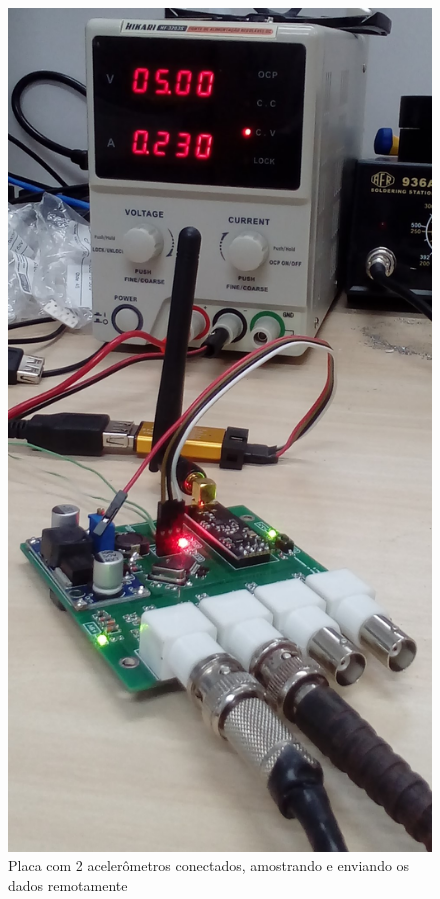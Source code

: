 \documentclass[11pt]{abntex2}
\begin{document}
				\begin{figure}[H]
					\centering
					\begin{minipage}{0.4\linewidth}
						\centering
						\includegraphics[width = .8\linewidth]{../Fotos/consumo2.jpg}
						\caption[Placa com 2 acelerômetros]{Placa com 2 acelerômetros conectados, amostrando e enviando os dados remotamente}
					\end{minipage}
					\hfill\vline\hfill
					\begin{minipage}{0.4\linewidth}
						\centering

\end{minipage}
\end{figure}
\end{document}
